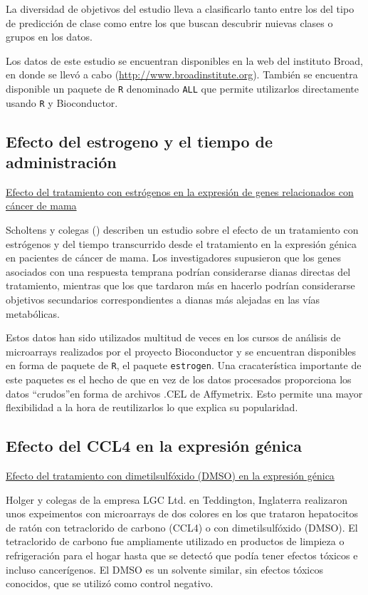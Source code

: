 La diversidad de objetivos del estudio lleva a clasificarlo tanto entre los del tipo de predicci\'on de clase como entre los que buscan descubrir nuievas clases o grupos en los datos.

Los datos de este estudio se encuentran disponibles en la web del instituto Broad, en donde se llev\'o a cabo (\href{http://www.broadinstitute.org}{http://www.broadinstitute.org}). Tambi\'en se encuentra disponible un paquete de \texttt{R} denominado \texttt{ALL} que permite utilizarlos directamente usando \texttt{R} y Bioconductor.

\subsection{Efecto del estrogeno y el tiempo de administraci\'on\label{estrogen}}

\underline{Efecto del tratamiento con estr\'ogenos en la expresi\'on de genes relacionados con c\'ancer de mama }

Scholtens y colegas (\cite{Scholtens:2004}) describen un estudio sobre el efecto de un tratamiento con estr\'ogenos y del tiempo transcurrido desde el tratamiento en la expresi\'on g\'enica en pacientes de c\'ancer de mama. Los investigadores supusieron que los genes asociados con una respuesta temprana podr\'ian considerarse dianas directas del tratamiento,
mientras que los que tardaron m\'as en hacerlo podr\'ian considerarse objetivos secundarios correspondientes a dianas m\'as alejadas en las
v\'ias metab\'olicas.

Estos datos han sido utilizados multitud de veces en los cursos de an\'alisis de microarrays realizados por el proyecto Bioconductor y se encuentran disponibles en forma de paquete de \texttt{R}, el paquete \texttt{estrogen}. Una cracater\'istica importante de este paquetes es el hecho de que en vez de los datos procesados proporciona  los datos ``crudos''en forma de archivos .CEL de Affymetrix. Esto permite una mayor flexibilidad a la hora de reutilizarlos lo que explica su popularidad.

\subsection{Efecto del CCL4 en la expresi\'on g\'enica\label{CCL4}}

\underline{Efecto del tratamiento con dimetilsulf\'oxido (DMSO) en la expresi\'on g\'enica }

Holger y colegas de la empresa LGC Ltd. en Teddington, Inglaterra realizaron unos expeimentos con microarrays de dos colores en los que trataron hepatocitos de rat\'on con tetraclorido de carbono (CCL4) o con dimetilsulf\'oxido (DMSO). El tetraclorido de carbono fue ampliamente utilizado en productos de limpieza o refrigeraci\'on para el hogar hasta que se detect\'o que pod\'ia tener efectos t\'oxicos e incluso cancer\'igenos. El DMSO es un solvente similar, sin efectos t\'oxicos conocidos, que se utiliz\'o como control negativo.


